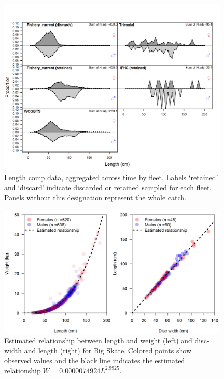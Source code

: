 \documentclass[12pt,]{article}
\begin{document}
\FloatBarrier

\FloatBarrier

\FloatBarrier

\FloatBarrier

\FloatBarrier

\FloatBarrier

\FloatBarrier

\newpage

\begin{figure}
\centering
\includegraphics{r4ss/plots_mod1/comp_lendat__aggregated_across_time.png}
\caption{Length comp data, aggregated across time by fleet. Labels
`retained' and `discard' indicate discarded or retained sampled for each
fleet. Panels without this designation represent the whole catch.
\label{fig:comp_lendat_aggregated_across_time}}
\end{figure}

\begin{figure}
\centering
\includegraphics{Figures/Big Skate bio relationships.png}
\caption{Estimated relationship between length and weight (left) and
disc-width and length (right) for Big Skate. Colored points show
observed values and the black line indicates the estimated relationship
\(W = 0.0000074924L^{2.9925}\).\label{fig:weight-length}}
\end{figure}
\end{document}
